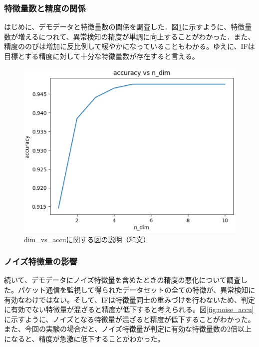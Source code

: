 \documentclass{css}
\begin{document}
\subsubsection{特徴量数と精度の関係}
はじめに、デモデータと特徴量数の関係を調査した．図\ref{fig:dim_vs_accu}に示すように、特徴量数が増えるにつれて、異常検知の精度が単調に向上することがわかった．また、精度ののびは増加に反比例して緩やかになっていることもわかる。ゆえに、IFは目標とする精度に対して十分な特徴量数が存在すると言える。

\begin{figure}[tb]
    \centering
    \includegraphics[width=\linewidth]{pictures/eps/dim_vs_accu.eps}
    \caption{dim\_vs\_accuに関する図の説明（和文）}
    \label{fig:dim_vs_accu}
\end{figure}

\subsubsection{ノイズ特徴量の影響}
続いて、デモデータにノイズ特徴量を含めたときの精度の悪化について調査した。パケット通信を監視して得られたデータセットの全ての特徴が、異常検知に有効なわけではない。そして、IFは特徴量同士の重みづけを行わないため、判定に有効でない特徴量が混ざると精度が低下すると考えられる。図\ref{fig:noise_accu}に示すように、ノイズとなる特徴量が混ざると精度が低下することがわかった。また、今回の実験の場合だと、ノイズ特徴量が判定に有効な特徴量数の2倍以上になると、精度が急激に低下することがわかった。
\end{document}
